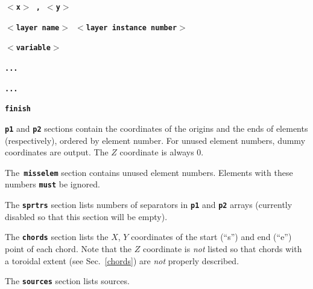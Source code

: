 \documentclass[12pt]{report}
\begin{document}
\textbf{\texttt{\begin{math}<\end{math}x\begin{math}>\end{math} ,
\begin{math}<\end{math}y\begin{math}>\end{math}}}

\textbf{\texttt{\begin{math}<\end{math}layer
name\begin{math}>\end{math} \begin{math}<\end{math}layer
instance number\begin{math}>\end{math}}}

\textbf{\texttt{\begin{math}<\end{math}variable\begin{math}>\end{math}}}

\textbf{\texttt{...}}


\textbf{\texttt{...}}


\textbf{\texttt{finish}}

\textbf{\texttt{p1}} and \textbf{\texttt{p2}} sections contain the
coordinates of the origins and the ends of elements (respectively), 
ordered by element number. For unused element 
numbers, dummy coordinates are output.
The $Z$ coordinate is always 0.

The\textbf{\texttt{ misselem}} section contains unused element
numbers. Elements with these numbers \textbf{\texttt{must}} be ignored.

The \textbf{\texttt{sprtrs}} section lists numbers of separators in
\textbf{\texttt{p1}} and \textbf{\texttt{p2}} arrays (currently
disabled so that this section will be empty).

The \textbf{\texttt{chords}} section lists the $X$, $Y$ coordinates
of the start (``s'') and end (``e'') point of each chord.  Note
that the $Z$ coordinate is {\em not} listed so that chords with
a toroidal extent (see Sec.~\ref{chords}) are {\em not} properly described.

The \textbf{\texttt{sources}} section lists sources.
\end{document}
